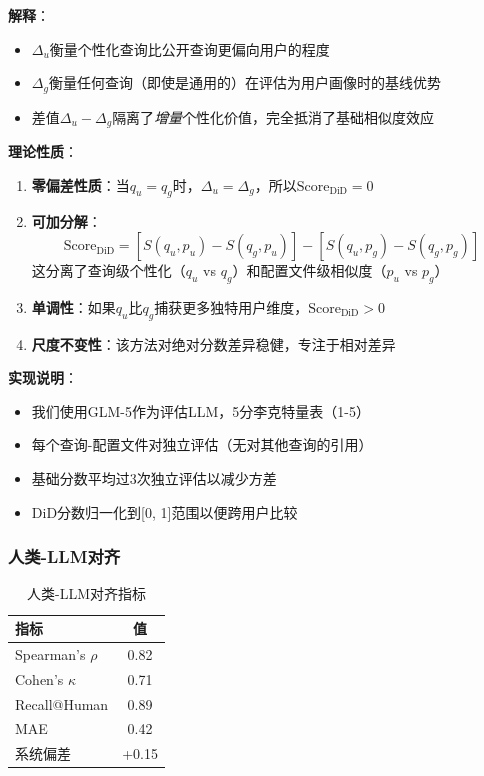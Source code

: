 \documentclass[11pt,a4paper]{article}
\begin{document}
\textbf{解释}：
\begin{itemize}
    \item $\Delta_u$衡量个性化查询比公开查询更偏向用户的程度
    \item $\Delta_g$衡量任何查询（即使是通用的）在评估为用户画像时的基线优势
    \item 差值$\Delta_u - \Delta_g$隔离了\textit{增量}个性化价值，完全抵消了基础相似度效应
\end{itemize}

\textbf{理论性质}：
\begin{enumerate}
    \item \textbf{零偏差性质}：当$q_u = q_g$时，$\Delta_u = \Delta_g$，所以$\text{Score}_{\text{DiD}} = 0$
    \item \textbf{可加分解}：
    $$\text{Score}_{\text{DiD}} = [S(q_u, p_u) - S(q_g, p_u)] - [S(q_u, p_g) - S(q_g, p_g)]$$
    这分离了查询级个性化（$q_u$ vs $q_g$）和配置文件级相似度（$p_u$ vs $p_g$）
    \item \textbf{单调性}：如果$q_u$比$q_g$捕获更多独特用户维度，$\text{Score}_{\text{DiD}} > 0$
    \item \textbf{尺度不变性}：该方法对绝对分数差异稳健，专注于相对差异
\end{enumerate}

\textbf{实现说明}：
\begin{itemize}
    \item 我们使用GLM-5作为评估LLM，5分李克特量表（1-5）
    \item 每个查询-配置文件对独立评估（无对其他查询的引用）
    \item 基础分数平均过3次独立评估以减少方差
    \item DiD分数归一化到[0, 1]范围以便跨用户比较
\end{itemize}

\subsubsection{人类-LLM对齐}

\begin{table}[h]
\centering
\begin{tabular}{lc}
\toprule
\textbf{指标} & \textbf{值} \\
\midrule
Spearman's $\rho$ & 0.82 \\
Cohen's $\kappa$ & 0.71 \\
Recall@Human & 0.89 \\
MAE & 0.42 \\
系统偏差 & +0.15 \\
\bottomrule
\end{tabular}
\caption{人类-LLM对齐指标}
\label{tab:human_llm}
\end{table}
\end{document}
